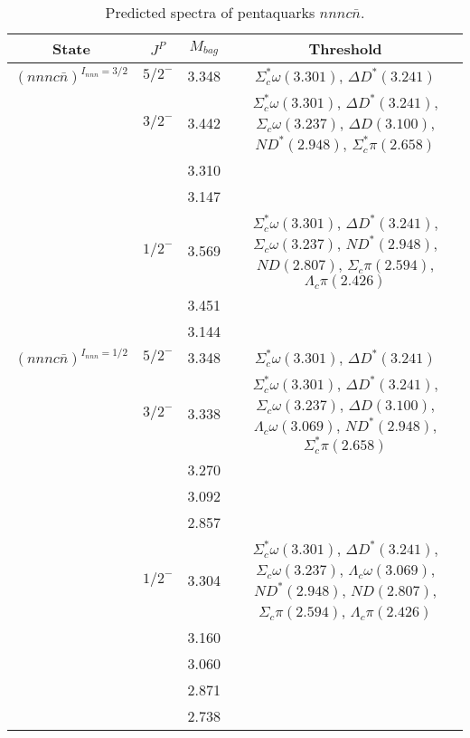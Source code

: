 \documentclass[prd,twocolumn,floatfix,nofootinbib]{revtex4}
\begin{document}
\renewcommand{\tabcolsep}{0.5cm}
\renewcommand{\arraystretch}{1.2}
\begin{table*}[!htbp]
    \caption{Predicted spectra of pentaquarks $nnnc\bar{n}$.}
    \begin{tabular}{cccc}
        \hline\hline
        {\rm State} &$J^{P}$ &$M_{bag}$ &Threshold \\ \hline
        ${(nnnc\bar{n})}^{I_{nnn}=3/2}$
            &${5/2}^{-}$    &3.348  &$\Sigma_{c}^{\ast}\omega(3.301)$, $\Delta D^{\ast}(3.241)$ \\
            &${3/2}^{-}$    &3.442  &$\Sigma_{c}^{\ast}\omega(3.301)$, $\Delta D^{\ast}(3.241)$, $\Sigma_{c}\omega(3.237)$, $\Delta D(3.100)$, $ND^{\ast}(2.948)$, $\Sigma_{c}^{\ast}\pi(2.658)$ \\
            &               &3.310  & \\
            &               &3.147  & \\
            &${1/2}^{-}$    &3.569  &$\Sigma_{c}^{\ast}\omega(3.301)$, $\Delta D^{\ast}(3.241)$, $\Sigma_{c}\omega(3.237)$, $ND^{\ast}(2.948)$, $ND(2.807)$, $\Sigma_{c}\pi(2.594)$, $\Lambda_{c}\pi(2.426)$ \\
            &               &3.451  & \\
            &               &3.144  & \\
        ${(nnnc\bar{n})}^{I_{nnn}=1/2}$
            &${5/2}^{-}$    &3.348  &$\Sigma_{c}^{\ast}\omega(3.301)$, $\Delta D^{\ast}(3.241)$ \\
            &${3/2}^{-}$    &3.338  &$\Sigma_{c}^{\ast}\omega(3.301)$, $\Delta D^{\ast}(3.241)$, $\Sigma_{c}\omega(3.237)$, $\Delta D(3.100)$, $\Lambda_{c}\omega(3.069)$, $ND^{\ast}(2.948)$, $\Sigma_{c}^{\ast}\pi(2.658)$ \\
            &               &3.270  & \\
            &               &3.092  & \\
            &               &2.857  & \\
            &${1/2}^{-}$    &3.304  &$\Sigma_{c}^{\ast}\omega(3.301)$, $\Delta D^{\ast}(3.241)$, $\Sigma_{c}\omega(3.237)$, $\Lambda_{c}\omega(3.069)$, $ND^{\ast}(2.948)$, $ND(2.807)$, $\Sigma_{c}\pi(2.594)$, $\Lambda_{c}\pi(2.426)$ \\
            &               &3.160  & \\
            &               &3.060  & \\
            &               &2.871  & \\
            &               &2.738  & \\
        \hline\hline
    \end{tabular}
\end{table*}
\end{document}
